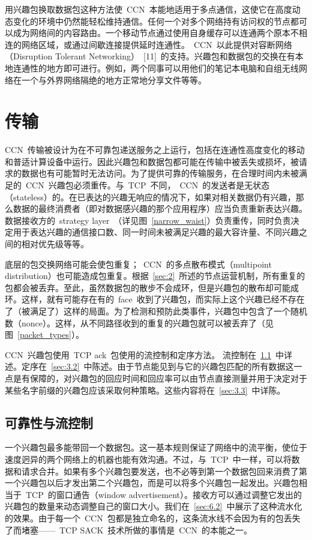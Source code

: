 用兴趣包换取数据包这种方法使~CCN~本能地适用于多点通信，这使它在高度动态变化的环境中仍然能轻松维持通信。任何一个对多个网络持有访问权的节点都可以成为网络间的内容路由。一个移动节点通过使用自身缓存可以连通两个原本不相连的网络区域，或通过间歇连接提供延时连通性。~CCN~以此提供对容断网络（Disruption Tolerant Networking）~[11]~的支持。兴趣包和数据包的交换在有本地连通性的地方即可进行。例如，两个同事可以用他们的笔记本电脑和自组无线网络在一个与外界网络隔绝的地方正常地分享文件等等。

\section{传输}
\label{sec:3}
CCN~传输被设计为在不可靠包递送服务之上运行，包括在连通性高度变化的移动和普适计算设备中运行。因此兴趣包和数据包都可能在传输中被丢失或损坏，被请求的数据也有可能暂时无法访问。为了提供可靠的传输服务，在合理时间内未被满足的~CCN~兴趣包必须重传。与~TCP~不同，~CCN~的发送者是无状态（stateless）的。在已表达的兴趣无响应的情况下，如果对相关数据仍有兴趣，那么数据的最终消费者（即对数据感兴趣的那个应用程序）应当负责重新表达兴趣。数据接收方的~strategy layer~（详见图~\ref{narrow_waist}）负责重传，同时负责决定用于表达兴趣的通信接口数、同一时间未被满足兴趣的最大容许量、不同兴趣之间的相对优先级等等。%

底层的包交换网络可能会使包重复；~CCN~的多点散布模式（multipoint distribution）也可能造成包重复。根据~\ref{sec:2}~所述的节点运营机制，所有重复的包都会被丢弃。至此，虽然数据包的散步不会成环，但是兴趣包的散布却可能成环。这样，就有可能存在有的~face~收到了兴趣包，而实际上这个兴趣已经不存在了（被满足了）这样的局面。为了检测和预防此类事件，兴趣包中包含了一个随机数（nonce）。这样，从不同路径收到的重复的兴趣包就可以被丢弃了（见图~\ref{packet_types}）。

CCN~兴趣包使用~TCP ack~包使用的流控制和定序方法。%
流控制在~\ref{sec:3.1}~中详述。定序在~\ref{sec:3.2}~中陈述。由于节点能见到与它的兴趣包匹配的所有数据这一点是有保障的，对兴趣包的回应时间和回应率可以由节点直接测量并用于决定对于某些名字前缀的兴趣包应该采取何种策略。这些内容将在~\ref{sec:3.3}~中详陈。

\subsection{可靠性与流控制}
\label{sec:3.1}
一个兴趣包最多能带回一个数据包。这一基本规则保证了网络中的流平衡，使位于速度迥异的两个网络上的机器也能有效沟通。不过，与~TCP~中一样，可以将数据和请求合并。如果有多个兴趣包要发送，也不必等到第一个数据包回来消费了第一个兴趣包以后才发出第二个兴趣包，而是可以将多个兴趣包一起发出。兴趣包相当于~TCP~的窗口通告（window advertisement）。接收方可以通过调整它发出的兴趣包的数量来动态调整自己的窗口大小。我们在~\ref{sec:6.2}~中展示了这种流水化的效果。由于每一个~CCN~包都是独立命名的，这条流水线不会因为有的包丢失了而堵塞——~TCP SACK~技术所做的事情是~CCN~的本能之一。

